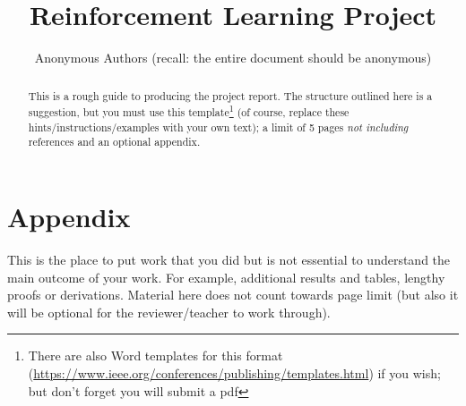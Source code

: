 \documentclass[journal, a4paper]{IEEEtran}
\begin{document}
\title{Reinforcement Learning Project}
\author{Anonymous Authors (recall: the entire document should be anonymous)}
\maketitle

\begin{abstract}
	This is a rough guide to producing the project report. 
	The structure outlined here is a suggestion, but you must use this template\footnote{There are also Word templates for this format (\url{https://www.ieee.org/conferences/publishing/templates.html}) if you wish; but don't forget you will submit a pdf} (of course, replace these hints/instructions/examples with your own text); a limit of 5 pages \emph{not including} references and an optional appendix. 
\end{abstract}







\newpage
\section*{Appendix}
This is the place to put work that you did but is not essential to understand the main outcome of your work. For example, additional results and tables, lengthy proofs or derivations. Material here does not count towards page limit (but also it will be optional for the reviewer/teacher to work through). 
\end{document}

